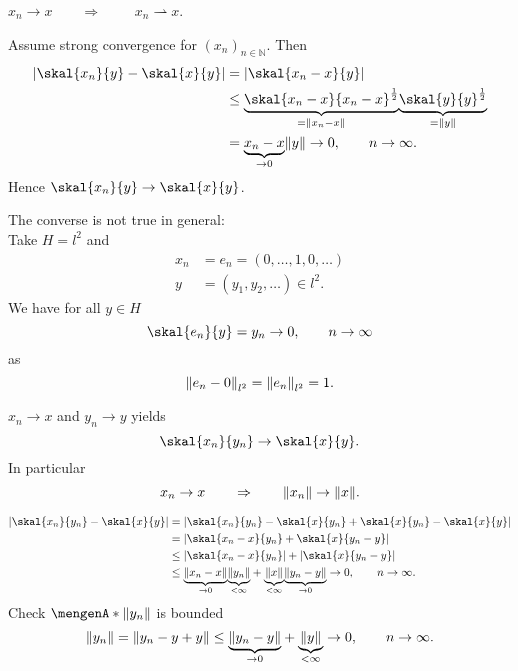 \begin{satz}
	$x_n \to x$$ \qquad \Rightarrow \qquad $ $x_n \rightharpoonup x$.
\end{satz}

\begin{beweis}
	Assume strong convergence for $(x_n)_{n \in \mathbb{N}}$. Then
	\begin{align*}
		\abs{\skal{x_n}{y}- \skal{x}{y}} &= \abs{\skal{x_n-x}{y}} \\
		&\leq \underset{=\norm{x_n-x}}{\underbrace{\skal{x_n-x}{x_n-x}^{\frac{1}{2}}}} \underset{= \norm{y}}{\underbrace{\skal{y}{y}^{\frac{1}{2}}}} \\
		&= \underset{ \to 0}{\underbrace{x_n-x}} \norm{y} \to 0, \qquad n \to \infty.
	\end{align*}
	Hence $\skal{x_n}{y} \to \skal{x}{y}$.
\end{beweis}

\begin{bemerkung}
	The converse is not true in general: \\
	Take $H=l^2$ and 
	\begin{align*}
		x_n &= e_n = (0, \dots,1,0,\dots) \\
		y &= (y_1,y_2,\dots) \in l^2.
	\end{align*}
	We have for all $y \in H$
	\[
		\skal{e_n}{y} = y_n \to 0, \qquad n \to \infty
	\]
	as
	\[
		\norm{e_n -0}_{l^2} = \norm{e_n}_{l^2} =1.
	\]
\end{bemerkung}

\begin{satz}
	$x_n \to x$ and $y_n \to y$ yields
	\[
		\skal{x_n}{y_n} \to \skal{x}{y}.
	\]
	In particular
	\[
		x_n \to x \qquad \Rightarrow \qquad \norm{x_n} \to \norm{x}.
	\]
\end{satz}
\begin{beweis}
	\begin{align*}
		\abs{\skal{x_n}{y_n}-\skal{x}{y}} &= \abs{\skal{x_n}{y_n}-\skal{x}{y_n} + \skal{x}{y_n} - \skal{x}{y}} \\
		&= \abs{\skal{x_n -x}{y_n} + \skal{x}{y_n-y}} \\
		&\leq \abs{\skal{x_n-x}{y_n}} + \abs{\skal{x}{y_n-y}} \\
		&\leq \underset{\to 0}{\underbrace{\norm{x_n-x}}} \underset{< \infty}{\underbrace{\norm{y_n}}} + \underset{< \infty}{\underbrace{\norm{x}}} \underset{\to 0}{\underbrace{\norm{y_n-y}}} \to 0, \qquad  n \to \infty.
	\end{align*}
	Check $\set{\norm{y_n}}$ is bounded
	\[
		\norm{y_n} = \norm{y_n -y +y} \leq \underset{\to 0}{\underbrace{\norm{y_n -y}}}+ \underset{< \infty}{\underbrace{\norm{y}}} \to 0, \qquad n \to \infty.
	\]
\end{beweis}

